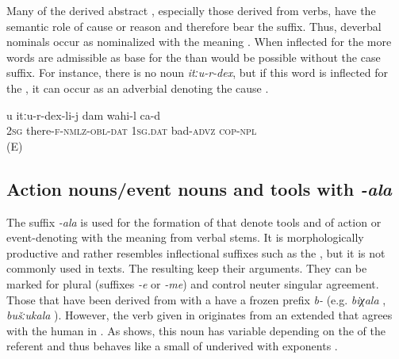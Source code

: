 Many of the derived abstract , especially those derived from verbs, have the semantic role of cause or reason and therefore bear the  suffix. Thus, deverbal nominals occur as nominalized  with the meaning . When inflected for the  more words are admissible as base for the  than would be possible without the case suffix. For instance, there is no noun \textit{itːu-r-dex}, but if this word is inflected for the , it can occur as an adverbial denoting the cause .
%
\begin{exe}
	\ex	\label{Because you are there I feel bad}
	\gll	u itːu-r-dex-li-j dam wahi-l ca-d \\
		2\textsc{sg}	there-\textsc{f-nmlz-obl}-\textsc{dat}	1\textsc{sg}.\textsc{dat}	bad-\textsc{advz} \textsc{cop-npl}\\
	\glt	{} (E)
\end{exe}



\subsection{Action nouns\slash event nouns and tools with \textit{-ala}}
\label{ssec:Action and event \isi{nouns} way of V-ing with -ala}

The suffix \textit{-ala} is used for the formation of  that denote tools and of action or event-denoting  with the meaning  from verbal stems. It is morphologically productive and rather resembles inflectional suffixes such as the , but it is not commonly used in texts. The resulting  keep their arguments. They can be marked for plural (suffixes \textit{-e} or \textit{-me}) and control neuter singular agreement. Those  that have been derived from  with a   have a frozen  prefix \textit{b-} (e.g. \textit{biχala} , \textit{bušːukala} ). However, the verb given in  originates from an extended  that agrees with the human  in . As  shows, this noun has variable  depending on the  of the referent and thus behaves like a small  of underived   with  exponents .
%




